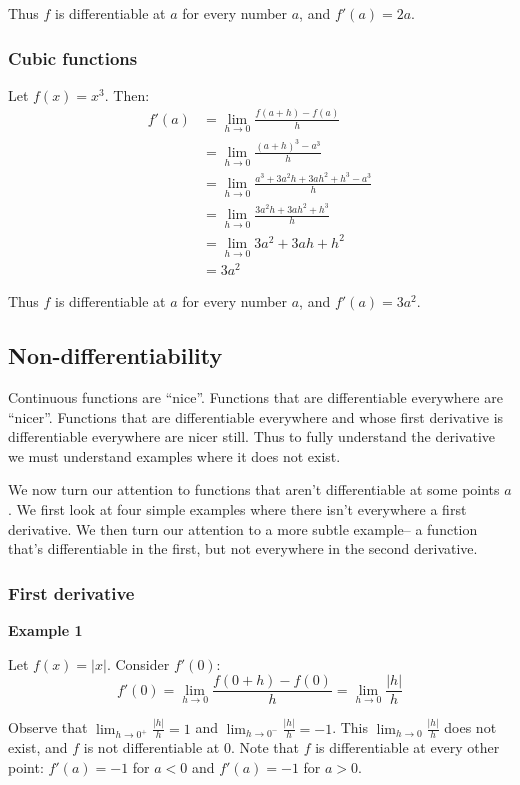 Thus $f$ is differentiable at $a$ for every number $a$, and $f'(a)=2a$.

\subsubsection*{Cubic functions}
Let $f(x)=x^3$. Then:
\begin{align*}
  f'(a)&=\lim_{h\to0}\frac{f(a+h)-f(a)}{h}\\
       &=\lim_{h\to0}\frac{(a+h)^3-a^3}{h}\\
       &=\lim_{h\to0}\frac{a^3+3a^2h+3ah^2+h^3-a^3}{h}\\
       &=\lim_{h\to0}\frac{3a^2h+3ah^2+h^3}{h}\\
       &=\lim_{h\to0}3a^2+3ah+h^2\\
       &=3a^2
\end{align*}

Thus $f$ is differentiable at $a$ for every number $a$, and $f'(a)=3a^2$.

\subsection{Non-differentiability}
Continuous functions are ``nice''. Functions that are differentiable
everywhere are ``nicer''. Functions that are differentiable everywhere
and whose first derivative is differentiable everywhere are nicer
still. Thus to fully understand the derivative we must understand
examples where it does not exist.

\vs

We now turn our attention to functions that aren't differentiable at
some points $a$. We first look at four simple examples where there
isn't everywhere a first derivative. We then turn our attention to a
more subtle example-- a function that's differentiable in the first,
but not everywhere in the second derivative.

\subsubsection*{First derivative}

\textbf{Example 1}

Let $f(x)=|x|$. Consider $f'(0)$:
\[f'(0)=\lim_{h\to0}\frac{f(0+h)-f(0)}{h}=\lim_{h\to0}\frac{|h|}{h}\]

Observe that $\lim_{h\to0^+}\frac{|h|}{h}=1$ and
$\lim_{h\to0^-}\frac{|h|}{h}=-1$. This $\lim_{h\to0}\frac{|h|}{h}$ does
not exist, and $f$ is not differentiable at $0$. Note that $f$ is
differentiable at every other point: $f'(a)=-1$ for $a<0$ and
$f'(a)=-1$ for $a>0$.

